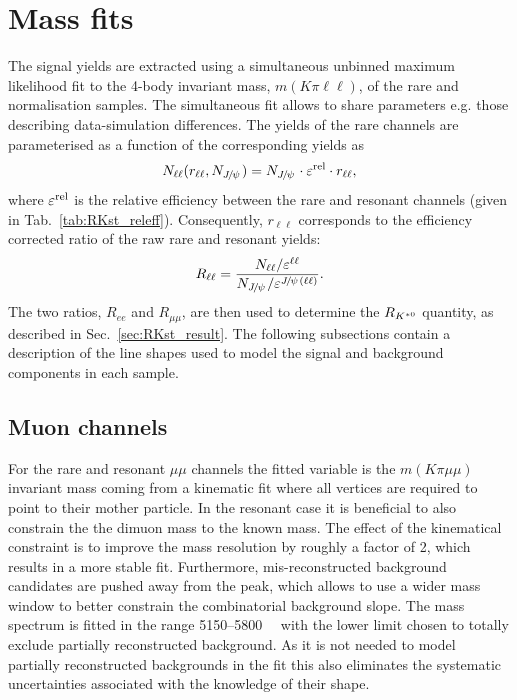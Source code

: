 \section{Mass fits}
\label{sec:rkst_fits}

The signal yields are extracted using a simultaneous unbinned maximum likelihood fit
to the 4-body invariant mass, $m(K\pi\ell\ell)$, of the rare and normalisation samples.
The simultaneous fit allows to share parameters e.g. those describing data-simulation differences.
The yields of the rare channels are parameterised as a function of the corresponding \jpsi yields as
%
\begin{equation}
N_{\ell\ell}(r_{\ell\ell}, N_{\jpsi}) = N_{\jpsi} \cdot \varepsilon^{\rm rel} \cdot r_{\ell\ell},
\end{equation}
%
where $\varepsilon^{\rm rel}$ is the relative efficiency between the rare and resonant channels
(given in Tab.~\ref{tab:RKst_releff}). Consequently, $r_{\ell\ell}$ corresponds to the efficiency corrected
ratio of the raw rare and resonant yields:
%
\begin{equation}
R_{\ell\ell} = \frac{N_{\ell\ell} / \varepsilon^{\ell\ell}}{N_{\jpsi} / \varepsilon^{\jpsi(\ell\ell)}}.
\end{equation}
%
The two ratios, $R_{ee}$ and $R_{\mu\mu}$, are then used to determine
the $R_{{{K}^{*0}}}$ quantity, as described in Sec.~\ref{sec:RKst_result}.
The following subsections contain a description of the line shapes used to model
the signal and background components in each sample.

\subsection{Muon channels}

For the rare and resonant $\mu\mu$ channels the fitted variable is the $m(K\pi \mu\mu)$ invariant mass coming
from a kinematic fit where all vertices are required to point to their mother particle.
In the resonant case it is beneficial to also constrain the the dimuon mass to the known \jpsi mass.
The effect of the kinematical constraint is to improve the mass resolution by roughly a factor of 2, which results
in a more stable fit. Furthermore, mis-reconstructed background candidates are pushed away from
the \Bz peak, which allows to use a wider mass window to better constrain the combinatorial background slope.
The mass spectrum is fitted in the range 5150--5800~\mevcc~ with the lower limit
chosen to totally exclude partially reconstructed background.
As it is not needed to model partially reconstructed backgrounds in the fit this also
eliminates the systematic uncertainties associated with the knowledge of their shape. 

